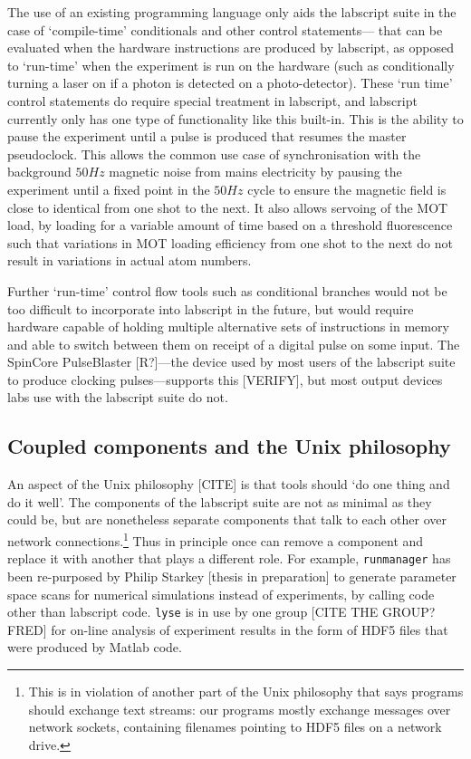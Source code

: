 The use of an existing programming language only aids the labscript suite in the case of `compile-time' conditionals and other control statements--- that can be evaluated when the hardware instructions are produced by labscript, as opposed to `run-time' when the experiment is run on the hardware (such as conditionally turning a laser on if a photon is detected on a photo-detector). These `run time' control statements do require special treatment in labscript, and labscript currently only has one type of functionality like this built-in. This is the ability to pause the experiment until a pulse is produced that resumes the master pseudoclock. This allows the common use case of synchronisation with the background $50\unit{Hz}$ magnetic noise from mains electricity by pausing the experiment until a fixed point in the $50\unit{Hz}$ cycle to ensure the magnetic field is close to identical from one shot to the next. It also allows servoing of the MOT load, by loading for a variable amount of time based on a threshold fluorescence such that variations in MOT loading efficiency from one shot to the next do not result in variations in actual atom numbers.

Further `run-time' control flow tools such as conditional branches would not be too difficult to incorporate into labscript in the future, but would require hardware capable of holding multiple alternative sets of instructions in memory and able to switch between them on receipt of a digital pulse on some input. The SpinCore PulseBlaster [R?]---the device used by most users of the labscript suite to produce clocking pulses---supports this [VERIFY], but most output devices labs use with the labscript suite do not.

\subsection{Coupled components and the Unix philosophy}

An aspect of the Unix philosophy [CITE] is that tools should `do one thing and do it well'. The components of the labscript suite are not as minimal as they could be, but are nonetheless separate components that talk to each other over network connections.\footnote{This is in violation of another part of the Unix philosophy that says programs should exchange text streams: our programs mostly exchange messages over network sockets, containing filenames pointing to HDF5 files on a network drive.} Thus in principle once can remove a component and replace it with another that plays a different role. For example, \texttt{runmanager} has been re-purposed by Philip Starkey [thesis in preparation] to generate parameter space scans for numerical simulations instead of experiments, by calling code other than labscript code. \texttt{lyse} is in use by one group [CITE THE GROUP? FRED] for on-line analysis of experiment results in the form of HDF5 files that were produced by Matlab code.

